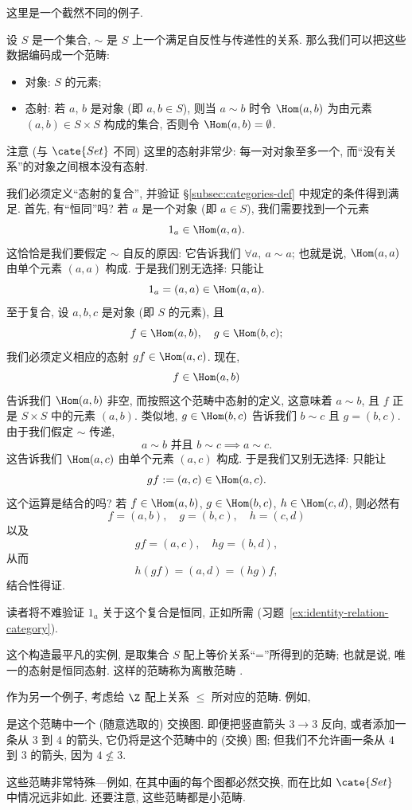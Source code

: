 \begin{example}
\label{ex:relation-category}
这里是一个截然不同的例子.

设 $S$ 是一个集合, $\sim$ 是 $S$ 上一个满足自反性与传递性的关系. 那么我们可以把这些数据编码成一个范畴:
\begin{itemize}
	\item 对象: $S$ 的元素;
	\item 态射: 若 $a$, $b$ 是对象 (即 $a, b \in S$), 则当 $a \sim b$ 时令 $\Hom(a,b)$ 为由元素 $(a,b) \in S \times S$ 构成的集合, 否则令 $\Hom(a,b) = \emptyset$.
\end{itemize}
注意 (与 $\cate{Set}$ 不同) 这里的态射非常少: 每一对对象至多一个, 而``没有关系''的对象之间根本没有态射.

我们必须定义``态射的复合'', 并验证 \S\ref{subsec:categories-def} 中规定的条件得到满足. 首先, 有``恒同''吗? 若 $a$ 是一个对象 (即 $a \in S$), 我们需要找到一个元素
\[
1_a \in \Hom(a, a).
\]
这恰恰是我们要假定 $\sim$ 自反的原因: 它告诉我们 $\forall a,\ a \sim a$; 也就是说, $\Hom(a,a)$ 由单个元素 $(a,a)$ 构成. 于是我们别无选择: 只能让
\[
1_a = (a, a) \in \Hom(a, a).
\]
至于复合, 设 $a, b, c$ 是对象 (即 $S$ 的元素), 且
\[
f \in \Hom(a, b), \quad g \in \Hom(b, c);
\]
我们必须定义相应的态射 $gf \in \Hom(a, c)$. 现在,
\[
f \in \Hom(a, b)
\]
告诉我们 $\Hom(a,b)$ 非空, 而按照这个范畴中态射的定义, 这意味着 $a \sim b$, 且 $f$ 正是 $S \times S$ 中的元素 $(a,b)$. 类似地, $g \in \Hom(b,c)$ 告诉我们 $b \sim c$ 且 $g = (b,c)$. 由于我们假定 $\sim$ 传递,
\[
a \sim b \text{ 并且 } b \sim c \implies a \sim c.
\]
这告诉我们 $\Hom(a,c)$ 由单个元素 $(a,c)$ 构成. 于是我们又别无选择: 只能让
\[
gf := (a, c) \in \Hom(a, c).
\]
这个运算是结合的吗? 若 $f \in \Hom(a, b)$, $g \in \Hom(b, c)$, $h \in \Hom(c, d)$, 则必然有
\[
f = (a, b), \quad g = (b, c), \quad h = (c, d)
\]
以及
\[
gf = (a, c), \quad hg = (b, d),
\]
从而
\[
h(gf) = (a, d) = (hg)f,
\]
结合性得证.

读者将不难验证 $1_a$ 关于这个复合是恒同, 正如所需 (习题~\ref{ex:identity-relation-category}).

这个构造最平凡的实例, 是取集合 $S$ 配上等价关系``=''所得到的范畴; 也就是说, 唯一的态射是恒同态射. 这样的范畴称为离散范畴%
.

作为另一个例子, 考虑给 $\Z$ 配上关系 $\leq$ 所对应的范畴. 例如,
\begin{center}
\end{center}
是这个范畴中一个 (随意选取的) 交换图. 即便把竖直箭头 $3 \to 3$ 反向, 或者添加一条从 $3$ 到 $4$ 的箭头, 它仍将是这个范畴中的 (交换) 图; 但我们不允许画一条从 $4$ 到 $3$ 的箭头, 因为 $4 \not\leq 3$.

这些范畴非常特殊---例如, 在其中画的每个图都必然交换, 而在比如 $\cate{Set}$ 中情况远非如此. 还要注意, 这些范畴都是小范畴.
\end{example}

